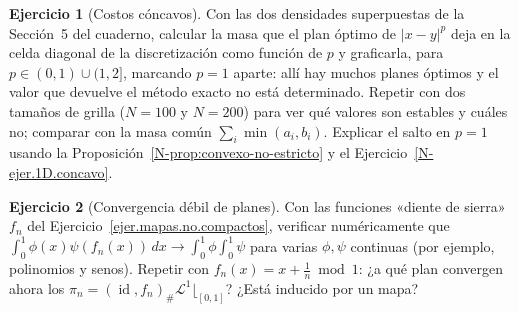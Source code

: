 \documentclass[11pt,a4paper]{amsart}
\newcounter{chapter}
\newcommand{\id}{\operatorname{id}}
\newcommand{\LL}{{\mathcal L}}
\theoremstyle{remark}
\theoremstyle{definition}
\newtheorem{ejercicio}{Ejercicio}[chapter]
\numberwithin{subsection}{section}
\numberwithin{equation}{section}
\begin{document}
\begin{ejercicio}[Costos cóncavos]\label{ejc.MK.concavos}
Con las dos densidades superpuestas de la Sección~5 del cuaderno, calcular la
masa que el plan óptimo de $|x-y|^p$ deja en la celda diagonal de la
discretización como función de $p$ y graficarla, para $p\in(0,1)\cup(1,2]$,
marcando $p=1$ aparte: allí hay muchos planes óptimos y el valor que devuelve
el método exacto no está determinado. Repetir con dos tamaños de grilla
($N=100$ y $N=200$) para ver qué valores son estables y cuáles no; comparar
con la masa común $\sum_i\min(a_i,b_i)$. Explicar el salto en $p=1$ usando la
Proposición~\ref{N-prop:convexo-no-estricto} y el
Ejercicio~\ref{N-ejer.1D.concavo}.
\end{ejercicio}

\begin{ejercicio}[Convergencia débil de planes]\label{ejc.MK.debil}
Con las funciones «diente de sierra» $f_n$ del
Ejercicio~\ref{ejer.mapas.no.compactos}, verificar numéricamente que
$\int_0^1\phi(x)\psi(f_n(x))\,dx\to\int_0^1\phi\int_0^1\psi$ para varias
$\phi,\psi$ continuas (por ejemplo, polinomios y senos). Repetir con
$f_n(x)=x+\frac1n \bmod 1$: ¿a qué plan convergen ahora los
$\pi_n=(\id,f_n)_\#\LL^1\lfloor_{[0,1]}$? ¿Está inducido por un mapa?
\end{ejercicio}



\end{document}
